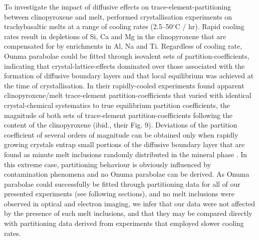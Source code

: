 \documentclass[review,authoryear,12pt]{elsarticle}
\newcommand{\dgC}{$^\circ$C }
\begin{document}

To investigate the impact of diffusive effects on trace-element-partitioning between clinopyroxene and melt, \citet{Mollo2013} performed crystallisation experiments on trachybasaltic melts at a range of cooling rates (2.5--50\dgC/ hr). Rapid cooling rates result in depletions of Si, Ca and Mg in the clinopyroxene that are compensated for by enrichments in Al, Na and Ti. Regardless of cooling rate, Ounma parabolae could be fitted through isovalent sets of partition-coefficients, indicating that crystal-lattice-effects dominated over those associated with the formation of diffusive boundary layers and that local equilibrium was achieved at the time of crystallisation.
    In their rapidly-cooled experiments \citet{Mollo2013} found apparent clinopyroxene/melt trace-element partition-coefficients that varied with identical crystal-chemical systematics to true equilibrium partition coefficients, the magnitude of both sets of trace-element partition-coefficients following the  content of the clinopyroxene (ibid., their Fig. 9). 
Deviations of the partition coefficient of several orders of magnitude can be obtained only when rapidly growing crystals entrap small portions of the diffusive boundary layer that are found as minute melt inclusions randomly distributed in the mineral phase \citep{Kennedy1993}. In this extreme case, partitioning behaviour is obviously influenced by contamination phenomena and no Onuma parabolae can be derived. As Onuma parabolae could successfully be fitted through partitioning data for all of our presented experiments (see following sections), and no melt inclusions were observed in optical and electron imaging, we infer that our data were not affected by the presence of such melt inclusions, and that they may be compared directly with partitioning data derived from experiments that employed slower cooling rates.
\end{document}
